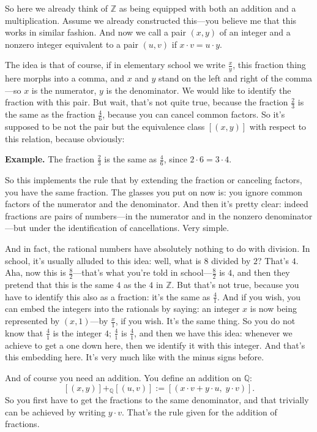So here we already think of $\mathbb{Z}$ as being equipped with both an addition and a multiplication. Assume we already constructed this---you believe me that this works in similar fashion. And now we call a pair $(x, y)$ of an integer and a nonzero integer equivalent to a pair $(u, v)$ if $x \cdot v = u \cdot y$.

The idea is that of course, if in elementary school we write $\frac{x}{y}$, this fraction thing here morphs into a comma, and $x$ and $y$ stand on the left and right of the comma---so $x$ is the numerator, $y$ is the denominator. We would like to identify the fraction with this pair. But wait, that's not quite true, because the fraction $\frac{2}{3}$ is the same as the fraction $\frac{4}{6}$, because you can cancel common factors. So it's supposed to be not the pair but the equivalence class $[(x, y)]$ with respect to this relation, because obviously:

\textbf{Example.} The fraction $\frac{2}{3}$ is the same as $\frac{4}{6}$, since $2 \cdot 6 = 3 \cdot 4$.

So this implements the rule that by extending the fraction or canceling factors, you have the same fraction. The glasses you put on now is: you ignore common factors of the numerator and the denominator. And then it's pretty clear: indeed fractions are pairs of numbers---in the numerator and in the nonzero denominator---but under the identification of cancellations. Very simple.

And in fact, the rational numbers have absolutely nothing to do with division. In school, it's usually alluded to this idea: well, what is $8$ divided by $2$? That's $4$. Aha, now this is $\frac{8}{2}$---that's what you're told in school---$\frac{8}{2}$ is $4$, and then they pretend that this is the same $4$ as the $4$ in $\mathbb{Z}$. But that's not true, because you have to identify this also as a fraction: it's the same as $\frac{4}{1}$. And if you wish, you can embed the integers into the rationals by saying: an integer $x$ is now being represented by $(x, 1)$---by $\frac{x}{1}$, if you wish. It's the same thing. So you do not know that $\frac{4}{1}$ is the integer $4$; $\frac{4}{1}$ is $\frac{4}{1}$, and then we have this idea: whenever we achieve to get a one down here, then we identify it with this integer. And that's this embedding here. It's very much like with the minus signs before.

And of course you need an addition. You define an addition on $\mathbb{Q}$:
\[
[(x, y)] +_{\mathbb{Q}} [(u, v)] := [(x \cdot v + y \cdot u,\; y \cdot v)].
\]
So you first have to get the fractions to the same denominator, and that trivially can be achieved by writing $y \cdot v$. That's the rule given for the addition of fractions.

